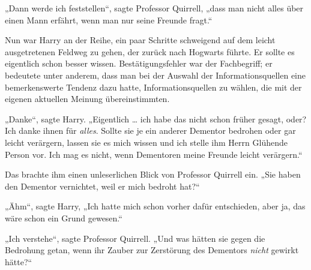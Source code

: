 „Dann werde ich feststellen“, sagte Professor Quirrell, „dass man nicht alles über einen Mann erfährt, wenn man nur seine Freunde fragt.“

Nun war Harry an der Reihe, ein paar Schritte schweigend auf dem leicht ausgetretenen Feldweg zu gehen, der zurück nach Hogwarts führte. Er sollte es eigentlich schon besser wissen. Bestätigungsfehler war der Fachbegriff; er bedeutete unter anderem, dass man bei der Auswahl der Informationsquellen eine bemerkenswerte Tendenz dazu hatte, Informationsquellen zu wählen, die mit der eigenen aktuellen Meinung übereinstimmten.%

„Danke“, sagte Harry.
„Eigentlich … ich habe das nicht schon früher gesagt, oder? Ich danke ihnen für \emph{alles}. Sollte sie je ein anderer Dementor bedrohen oder gar leicht verärgern, lassen sie es mich wissen und ich stelle ihm Herrn Glühende Person vor. Ich mag es nicht, wenn Dementoren meine Freunde leicht verärgern.“

Das brachte ihm einen unleserlichen Blick von Professor Quirrell ein.
„Sie haben den Dementor vernichtet, weil er mich bedroht hat?“

„Ähm“, sagte Harry,
„Ich hatte mich schon vorher dafür entschieden, aber ja, das wäre schon ein Grund gewesen.“

„Ich verstehe“, sagte Professor Quirrell.
„Und was hätten sie gegen die Bedrohung getan, wenn ihr Zauber zur Zerstörung des Dementors \emph{nicht} gewirkt hätte?“

